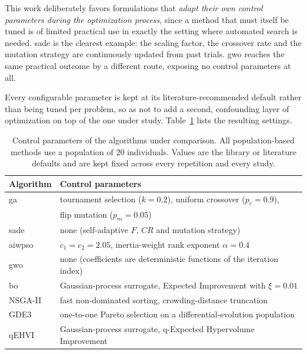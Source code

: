 This work deliberately favors formulations that \emph{adapt their own control parameters during the optimization process}, since a method that must itself be tuned is of limited practical use in exactly the setting where automated search is needed. \acrshort{sade} is the clearest example: the scaling factor, the crossover rate and the mutation strategy are continuously updated from past trials. \acrshort{gwo} reaches the same practical outcome by a different route, exposing no control parameters at all.

Every configurable parameter is kept at its literature-recommended default rather than being tuned per problem, so as not to add a second, confounding layer of optimization on top of the one under study. Table~\ref{tab:algorithm_params} lists the resulting settings.

\begin{table}[ht]
    \centering
    \caption{Control parameters of the algorithms under comparison. All population-based methods use a population of $20$ individuals. Values are the library or literature defaults and are kept fixed across every repetition and every study.}
    \label{tab:algorithm_params}
    \begin{tabular}{ll}
        \toprule
        \textbf{Algorithm} & \textbf{Control parameters} \\
        \midrule
        \acrshort{ga}      & tournament selection ($k = 0.2$), uniform crossover ($p_c = 0.9$), \\
                           & flip mutation ($p_m = 0.05$) \\
        \acrshort{sade}    & none (self-adaptive $F$, $CR$ and mutation strategy) \\
        \acrshort{aiwpso}  & $c_1 = c_2 = 2.05$, inertia-weight rank exponent $\alpha = 0.4$ \\
        \acrshort{gwo}     & none (coefficients are deterministic functions of the iteration index) \\
        \acrshort{bo}      & Gaussian-process surrogate, Expected Improvement with $\xi = 0.01$ \\
        \midrule
        NSGA-II            & fast non-dominated sorting, crowding-distance truncation \\
        GDE3               & one-to-one Pareto selection on a differential-evolution population \\
        qEHVI              & Gaussian-process surrogate, q-Expected Hypervolume Improvement \\
        \bottomrule
    \end{tabular}
\end{table}

